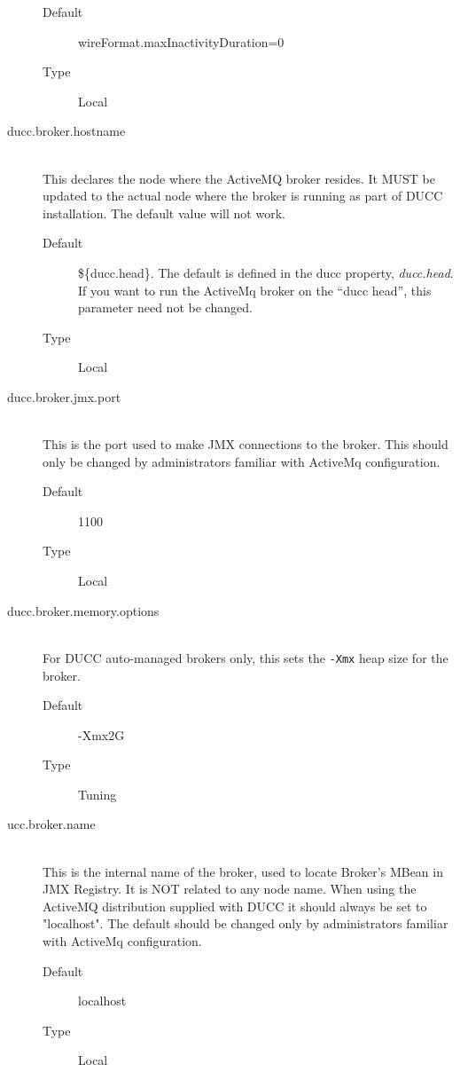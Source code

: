 \begin{description}
         \begin{description}
           \item[Default] wireFormat.maxInactivityDuration=0 
           \item[Type] Local 
         \end{description}

       \item[ducc.broker.hostname] \hfill \\
         This declares the node where the ActiveMQ broker resides. It MUST be updated to 
         the actual node where the broker is running as part of DUCC installation. The default value 
         will not work.          
         \begin{description}               
           \item[Default] \$\{ducc.head\}.  The default is defined in the ducc property, {\em ducc.head}.
             If you want to run the ActiveMq broker on the ``ducc head'', this parameter need not
             be changed.
           \item[Type] Local 
         \end{description}

       \item[ducc.broker.jmx.port] \hfill \\
         This is the port used to make JMX connections to the broker.  This should only
         be changed by administrators familiar with ActiveMq configuration.         
         \begin{description}         
           \item[Default] 1100                      
           \item[Type] Local 
         \end{description}

       \item[ducc.broker.memory.options] \hfill \\
         For DUCC auto-managed brokers only, this sets the {\tt -Xmx} heap size for the broker.
         \begin{description}
           \item[Default] -Xmx2G
           \item[Type] Tuning
         \end{description} 
           

       \item[ucc.broker.name] \hfill \\
         This is the internal name of the broker, used to locate Broker's MBean in JMX Registry. 
         It is NOT related to any node name. When using the ActiveMQ distribution supplied with 
         DUCC it should always be set to "localhost".  The default should be changed only by
         administrators familiar with ActiveMq configuration.
         \begin{description}
           \item[Default] localhost 
           \item[Type] Local              
         \end{description}



\end{description}

